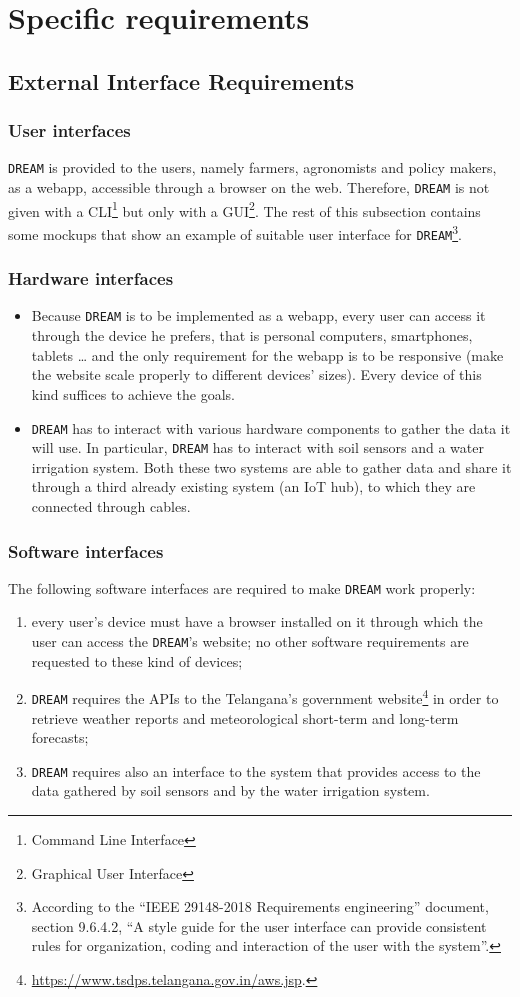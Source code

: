 \documentclass{article}
\begin{document}
\section{Specific requirements}
\subsection{External Interface Requirements}
\subsubsection{User interfaces}
\verb|DREAM| is provided to the users, namely farmers, agronomists and policy makers, as a webapp, accessible through a browser on the web. Therefore, \verb|DREAM| is not given with a CLI\footnote{Command Line Interface} but only with a GUI\footnote{Graphical User Interface}. The rest of this subsection contains some mockups that show an example of suitable user interface for \verb|DREAM|\footnote{According to the “IEEE 29148-2018 Requirements engineering” document, section 9.6.4.2, “A style guide for the user interface can provide consistent rules for organization, coding and interaction of the user with the system”.}.
\subsubsection{Hardware interfaces}
\begin{itemize}
\item Because \verb|DREAM| is to be implemented as a webapp, every user can access it through the device he prefers, that is personal computers, smartphones, tablets … and the only requirement for the webapp is to be responsive (make the website scale properly to different devices’ sizes). Every device of this kind suffices to achieve the goals.
\item \verb|DREAM| has to interact with various hardware components to gather the data it will use. In particular, \verb|DREAM| has to interact with soil sensors and a water irrigation system. Both these two systems are able to gather data and share it through a third already existing system (an IoT hub), to which they are connected through cables.
\end{itemize}
\subsubsection{Software interfaces}
The following software interfaces are required to make \verb|DREAM| work properly:
\begin{enumerate}
\item every user’s device must have a browser installed on it through which the user can access the \verb|DREAM|’s website; no other software requirements are requested to these kind of devices;
\item \verb|DREAM| requires the APIs to the Telangana’s government website\footnote{\url{https://www.tsdps.telangana.gov.in/aws.jsp}.} in order to retrieve weather reports and meteorological short-term and long-term forecasts;
\item \verb|DREAM| requires also an interface to the system that provides access to the data gathered by soil sensors and by the water irrigation system.
\end{enumerate}
\end{document}
